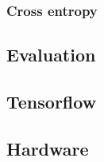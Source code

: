 \subsubsection{Cross entropy}


\subsection{Evaluation}



\subsection{Tensorflow}


\subsection{Hardware}
